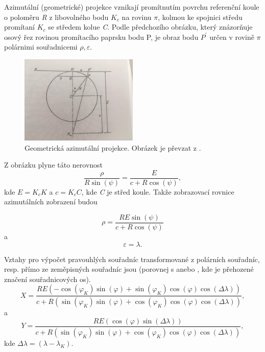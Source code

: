 \documentclass[11pt,a4paper]{article}
\begin{document}
Azimutální (geometrické) projekce vznikají promítnutím povrchu referenční koule o poloměru \textit{R} z libovolného bodu $K_{c}$ na rovinu $\pi$, kolmou ke spojnici středu promítaní $K_{c}$ se středem kolue \textit{C}. Podle předchozího obrázku, který znázorňuje osový řez rovinou promítacího paprsku bodu P, je obraz bodu $P^{'}$ určen v rovině $\pi$ polárnimi souřadnicemi $\rho, \varepsilon$.

\begin{figure}[ht!]
\begin{center}

\includegraphics[width=0.5\textwidth]{FIG/azimProj.jpg}
\caption{Geometrická azimutální projekce. Obrázek je převzat z \cite{Buchar2002}.}
\label{fig:azimProj}
\end{center}
\end{figure}

Z obrázku plyne táto nerovnost
\begin{equation}
\dfrac{\rho}{R\sin{\left(\psi\right)}} = \dfrac{E}{c+R\cos{\left(\psi\right)}},
\end{equation}
kde $E = K_{c}K$ a $c = K_{c}C$, kde \textit{C} je střed koule. Takže zobrazovací rovnice azimutálních zobrazení budou

\begin{equation}
\rho = \dfrac{RE\sin{\left(\psi\right)}}{c+R\cos{\left(\psi\right)}}
\end{equation}
a
\begin{equation}
\varepsilon = \lambda.
\end{equation}

Vztahy pro výpočet pravouhlých souřadníc transformované z polárních souřadníc, resp. přímo ze zeměpisných souřadníc jsou (porovnej s \cite{stereoWolf} anebo \cite{Thomas1977},  kde je přehozené značení souřadnicových os).
\begin{equation}
X = \dfrac{RE\left(-\cos{\left(\varphi_{K}\right)}\sin{\left(\varphi\right)}+\sin{\left(\varphi_{K}\right)}\cos{\left(\varphi\right)}\cos{\left(\Delta\lambda\right)}\right)}{c+R\left( \sin{\left(\varphi_{K}\right)}\sin{\left(\varphi\right)}+\cos{\left(\varphi_{K}\right)}\cos{\left(\varphi\right)}\cos{\left(\Delta\lambda\right)} \right)},
\end{equation}
a
\begin{equation}
Y = \dfrac{RE\left(\cos{\left(\varphi\right)}\sin{\left(\Delta\lambda\right)}\right)}{c+R\left( \sin{\left(\varphi_{K}\right)}\sin{\left(\varphi\right)}+\cos{\left(\varphi_{K}\right)}\cos{\left(\varphi\right)}\cos{\left(\Delta\lambda\right)} \right)},
\end{equation}
kde $\Delta\lambda = \left(\lambda - \lambda_{K}\right)$.
\end{document}
